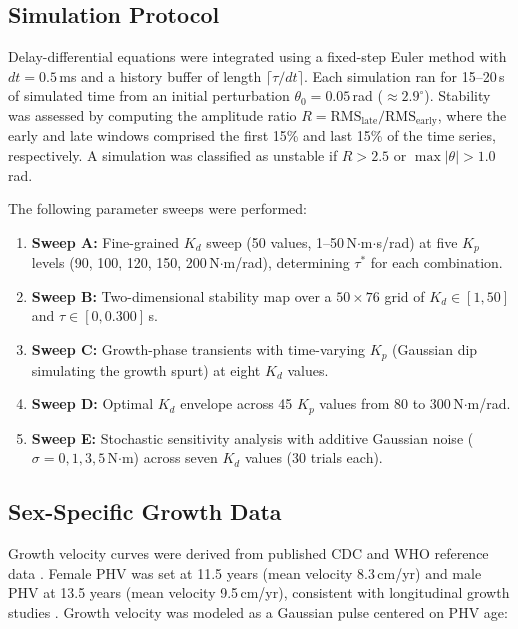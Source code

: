 \documentclass[12pt,a4paper]{article}
\begin{document}
\subsection{Simulation Protocol}

Delay-differential equations were integrated using a fixed-step Euler method with $dt = 0.5$\,ms and a history buffer of length $\lceil\tau/dt\rceil$. Each simulation ran for 15--20\,s of simulated time from an initial perturbation $\theta_0 = 0.05$\,rad ($\approx 2.9^{\circ}$). Stability was assessed by computing the amplitude ratio $R = \text{RMS}_{\text{late}} / \text{RMS}_{\text{early}}$, where the early and late windows comprised the first 15\% and last 15\% of the time series, respectively. A simulation was classified as unstable if $R > 2.5$ or $\max|\theta| > 1.0$\,rad.

The following parameter sweeps were performed:

\begin{enumerate}
\item \textbf{Sweep A:} Fine-grained $K_d$ sweep (50 values, 1--50\,N$\cdot$m$\cdot$s/rad) at five $K_p$ levels (90, 100, 120, 150, 200\,N$\cdot$m/rad), determining $\tau^*$ for each combination.
\item \textbf{Sweep B:} Two-dimensional stability map over a $50 \times 76$ grid of $K_d \in [1, 50]$ and $\tau \in [0, 0.300]$\,s.
\item \textbf{Sweep C:} Growth-phase transients with time-varying $K_p$ (Gaussian dip simulating the growth spurt) at eight $K_d$ values.
\item \textbf{Sweep D:} Optimal $K_d$ envelope across 45 $K_p$ values from 80 to 300\,N$\cdot$m/rad.
\item \textbf{Sweep E:} Stochastic sensitivity analysis with additive Gaussian noise ($\sigma = 0, 1, 3, 5$\,N$\cdot$m) across seven $K_d$ values (30 trials each).
\end{enumerate}

\subsection{Sex-Specific Growth Data}

Growth velocity curves were derived from published CDC and WHO reference data \citep{cdc2000growth, who2007growth}. Female PHV was set at 11.5 years (mean velocity 8.3\,cm/yr) and male PHV at 13.5 years (mean velocity 9.5\,cm/yr), consistent with longitudinal growth studies \citep{sanders2017maturity, tanner1966growth}. Growth velocity was modeled as a Gaussian pulse centered on PHV age:
\end{document}
